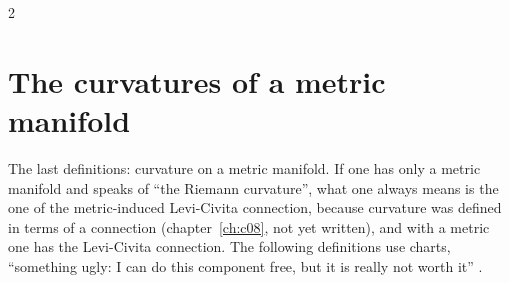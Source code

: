 \begin{paracol}{2}
\section{The curvatures of a metric manifold}\label{sec:c10-curvature}

The last definitions: curvature on a metric manifold. If one has only a metric manifold and speaks of ``the Riemann curvature'', what one always means is the one of the metric-induced Levi-Civita connection, because curvature was defined in terms of a connection (chapter~\ref{ch:c08}, not yet written), and with a metric one has the Levi-Civita connection. The following definitions use charts, ``something ugly: I can do this component free, but it is really not worth it'' .


\end{paracol}
